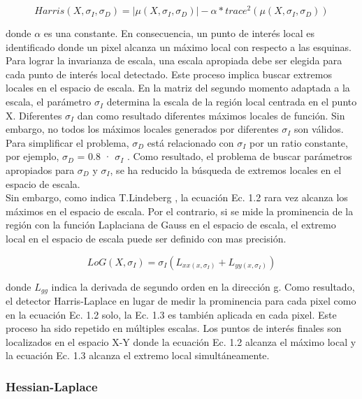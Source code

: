 \[
Harris(X, \sigma_{I}, \sigma_{D}) = \left | \mu (X, \sigma_{I}, \sigma_{D}) \right | - \alpha*trace^{2}(\mu (X, \sigma_{I}, \sigma_{D}))
\]

donde $\alpha$ es una constante. En consecuencia, un punto de interés local es identificado donde un pixel alcanza un máximo local con respecto a las esquinas. \\

Para lograr la invarianza de escala, una escala apropiada debe ser elegida para cada punto de interés local detectado. Este proceso implica buscar extremos locales en el espacio de escala. En la matriz del segundo momento adaptada a la escala, el parámetro $\sigma_{I}$ determina la escala de la región local centrada en el punto X. Diferentes $\sigma_{I}$ dan como resultado diferentes máximos locales de función. Sin embargo, no todos los máximos locales generados por diferentes $\sigma_{I}$ son válidos.  Para simplificar el problema, $\sigma_{D}$ está relacionado con $\sigma_{I}$ por un ratio constante, por ejemplo, $\sigma_{D}$ = 0.8 · $\sigma_{I}$ . Como resultado, el problema de buscar parámetros apropiados para $\sigma_{D}$ y $\sigma_{I}$, se ha reducido la búsqueda de extremos locales en el espacio de escala. \\

Sin embargo, como indica T.Lindeberg \cite{Reference26}, la ecuación Ec. 1.2 rara vez alcanza los máximos en el espacio de escala. Por el contrario, si se mide la prominencia de la región con la función Laplaciana de Gauss en el espacio de escala, el extremo local en el espacio de escala puede ser definido con mas precisión.

\[
LoG(X, \sigma_{I}) = \sigma_{I}(L_{xx(x, \sigma_{I})} + L_{yy(x, \sigma_{I})})
\]

donde $L_{gg}$ indica la derivada de segundo orden en la dirección g. Como resultado, el detector Harris-Laplace en lugar de medir la prominencia para cada pixel como en la ecuación Ec. 1.2 solo, la Ec. 1.3 es también aplicada en cada pixel. Este proceso ha sido repetido en múltiples escalas. Los puntos de interés finales son localizados en el espacio X-Y donde la ecuación Ec. 1.2 alcanza el máximo local y la ecuación Ec. 1.3 alcanza el extremo local simultáneamente. \\


\subsubsection{Hessian-Laplace}

